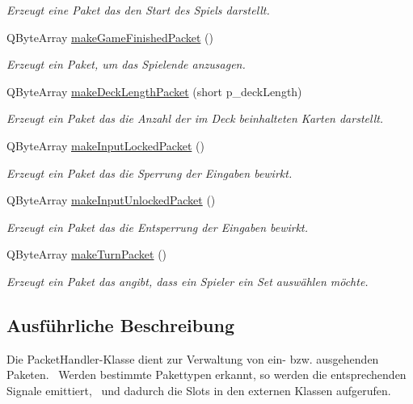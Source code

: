 \begin{DoxyCompactItemize}
\begin{DoxyCompactList}\small\item\em Erzeugt eine Paket das den Start des Spiels darstellt. \end{DoxyCompactList}\item 
Q\+Byte\+Array \hyperlink{class_packet_handler_ad8cdb7008eb99e5dfc5383746d18b4f3}{make\+Game\+Finished\+Packet} ()
\begin{DoxyCompactList}\small\item\em Erzeugt ein Paket, um das Spielende anzusagen. \end{DoxyCompactList}\item 
Q\+Byte\+Array \hyperlink{class_packet_handler_a3de99e5e6f714e26f558c99bfdfc6968}{make\+Deck\+Length\+Packet} (short p\+\_\+deck\+Length)
\begin{DoxyCompactList}\small\item\em Erzeugt ein Paket das die Anzahl der im Deck beinhalteten Karten darstellt. \end{DoxyCompactList}\item 
Q\+Byte\+Array \hyperlink{class_packet_handler_ad64f92836fdc7415ce7b012065bd985b}{make\+Input\+Locked\+Packet} ()
\begin{DoxyCompactList}\small\item\em Erzeugt ein Paket das die Sperrung der Eingaben bewirkt. \end{DoxyCompactList}\item 
Q\+Byte\+Array \hyperlink{class_packet_handler_a49c990160b529af585b201b8690058ef}{make\+Input\+Unlocked\+Packet} ()
\begin{DoxyCompactList}\small\item\em Erzeugt ein Paket das die Entsperrung der Eingaben bewirkt. \end{DoxyCompactList}\item 
Q\+Byte\+Array \hyperlink{class_packet_handler_a76a8c456652beb81888ddb02718db34c}{make\+Turn\+Packet} ()
\begin{DoxyCompactList}\small\item\em Erzeugt ein Paket das angibt, dass ein Spieler ein Set auswählen möchte. \end{DoxyCompactList}\end{DoxyCompactItemize}


\subsection{Ausführliche Beschreibung}
Die Packet\+Handler-\/\+Klasse dient zur Verwaltung von ein-\/ bzw. ausgehenden Paketen.~\newline
 Werden bestimmte Pakettypen erkannt, so werden die entsprechenden Signale emittiert,~\newline
 und dadurch die Slots in den externen Klassen aufgerufen. 


